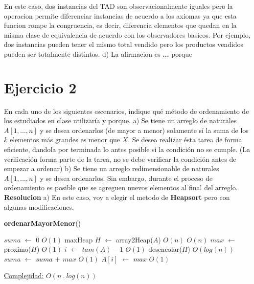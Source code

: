 \documentclass[10pt,a4paper]{article}
\begin{document}
\medskip
\medskip
En este caso, dos instancias del TAD  son observacionalmente iguales pero la operacion  permite diferenciar instancias de acuerdo a los axiomas ya que esta funcion rompe la congruencia, es decir, diferencia elementos que quedan en la misma clase de equivalencia de acuerdo con los observadores basicos. Por ejemplo, dos instancias pueden tener el mismo total vendido pero los productos vendidos pueden ser totalmente distintos.   
\newline
\newline
d) La afirmacion es \textbf{...} porque 
\newpage

\section{Ejercicio 2}

En cada uno de los siguientes escenarios, indique qué método de ordenamiento de los estudiados en clase utilizaría y porque.
\newline
\newline
a) Se tiene un arreglo de naturales $A[1,...,n]$ y se desea ordenarlos (de mayor a menor) solamente sí la suma de los $k$ elementos más grandes es menor que $X$. Se desea realizar ésta tarea de forma eficiente, dandola por terminada lo antes posible si la condición no se cumple. (La verificación forma parte de la tarea, no se debe verificar la condición antes de empezar a ordenar)
\newline
\newline
b) Se tiene un arreglo redimensionable de naturales $A[1,...,n]$ y se desea ordenarlos. Sin embargo, durante el proceso de ordenamiento es posible que se agreguen nuevos elementos al final del arreglo.
\newline
\newline
\textbf{Resolucion}
\newline
\newline
a) En este caso, voy a elegir el metodo de \textbf{Heapsort} pero con algunas modificaciones. 

\begin{algorithm}[H]{\textbf{ordenarMayorMenor}()}
	\begin{algorithmic}[1]
		\State $suma$ $\gets$ 0             				     \Comment $O(1)$
		\State maxHeap $H$ $\gets$ array2Heap($A$)               \Comment $O(n)$
		 	                     \Comment $O(n)$
		\State $max$ $\gets$ proximo($H$)                        \Comment $O(1)$
		\State $i$ $\gets$ $tam(A) - 1$             			 \Comment $O(1)$
		\Else
		\State desencolar($H$)                              \Comment $O(log(n))$
		\State $suma$ $\gets$ $suma$ $+$ $max$                   \Comment $O(1)$
		\State $A[i]$ $\gets$ $max$                              \Comment $O(1)$
		\EndIf
		\EndFor
		
		\medskip
		\Statex \underline{Complejidad:} $O(n ~.~ log(n))$
	\end{algorithmic}
\end{algorithm}
\end{document}
